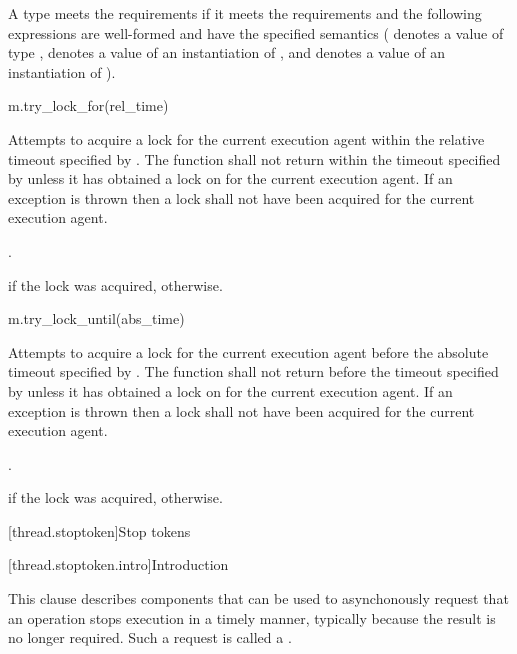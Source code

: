 \pnum
A type  meets the  requirements if it meets the 
requirements and the following expressions are well-formed and have the specified semantics
( denotes a value of type ,  denotes a value of an
instantiation of , and  denotes a value
of an instantiation of ).

\begin{itemdecl}
m.try_lock_for(rel_time)
\end{itemdecl}

\begin{itemdescr}
\pnum
\effects
Attempts to acquire a lock for the current execution agent within the relative
timeout specified by . The function shall not return
within the timeout specified by  unless it has obtained a lock on 
for the current execution agent. If an exception is thrown then a lock shall not have been
acquired for the current execution agent.

\pnum
\returntype {}.

\pnum
\returns
{} if the lock was acquired,  otherwise.
\end{itemdescr}

\begin{itemdecl}
m.try_lock_until(abs_time)
\end{itemdecl}

\begin{itemdescr}
\pnum
\effects
Attempts to acquire a lock for the current execution agent before the absolute
timeout specified by . The function shall not return
before the timeout specified by  unless it has obtained a lock on  for
the current execution agent. If an exception is thrown then a lock shall not have been acquired
for the current execution agent.

\pnum
\returntype {}.

\pnum
\returns
{} if the lock was acquired,  otherwise.
\end{itemdescr}

[thread.stoptoken]{Stop tokens}

[thread.stoptoken.intro]{Introduction}

\pnum
This clause describes components that can be used
to asynchonously request that an operation stops execution in a timely manner,
typically because the result is no longer required.
Such a request is called a .


